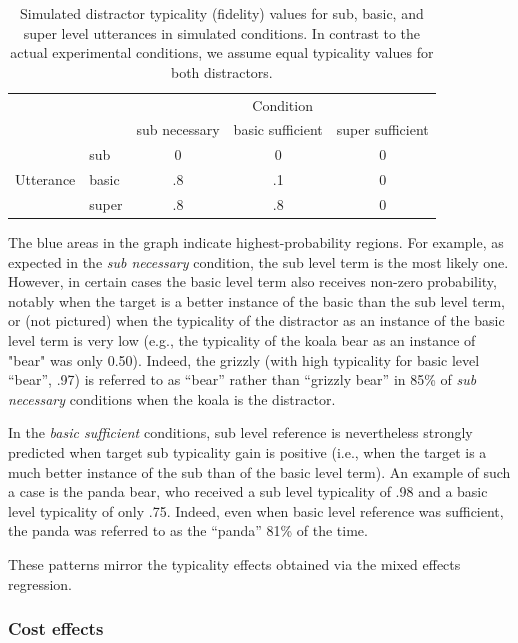 \documentclass[11pt]{article}
\begin{document}
\begin{table}
\centering
\caption{Simulated distractor typicality (fidelity) values for sub, basic, and super level utterances in simulated conditions. In contrast to the actual experimental conditions, we assume equal typicality values for both distractors.}
\begin{tabular}{l l c c c}
\toprule
& & \multicolumn{3}{c}{Condition}\\
& & sub necessary & basic sufficient & super sufficient\\
\midrule
\multirow{3}{*}{Utterance} & sub & 0 & 0 & 0 \\
& basic & .8 & .1 & 0 \\
& super & .8 & .8 & 0\\
\bottomrule
\end{tabular}
\label{tab:simulatedtyps}
\end{table}

The blue areas in the graph indicate highest-probability regions. For example, as expected in the \emph{sub necessary} condition, the sub level term is the most likely one. However, in certain cases the basic level term also receives non-zero probability, notably when the target is a better instance of the basic than the sub level term, or (not pictured) when the typicality of the distractor as an instance of the basic level term is very low  (e.g., the typicality of the koala bear as an instance of "bear" was only 0.50). Indeed, the grizzly (with high typicality for basic level ``bear'', .97) is referred to as ``bear'' rather than ``grizzly bear'' in 85\% of \emph{sub necessary} conditions when the koala is the distractor. 

In the \emph{basic sufficient} conditions, sub level reference is nevertheless strongly predicted when target sub typicality gain is positive (i.e., when the target is a much better instance of the sub than of the basic level term). An example of such a case is the panda bear, who received a sub level typicality of .98 and a basic level typicality of only .75. Indeed, even when basic level reference was sufficient, the panda was referred to as the ``panda'' 81\% of the time.

These patterns mirror the typicality effects obtained via the mixed effects regression.


\subsubsection{Cost effects}
\end{document}
